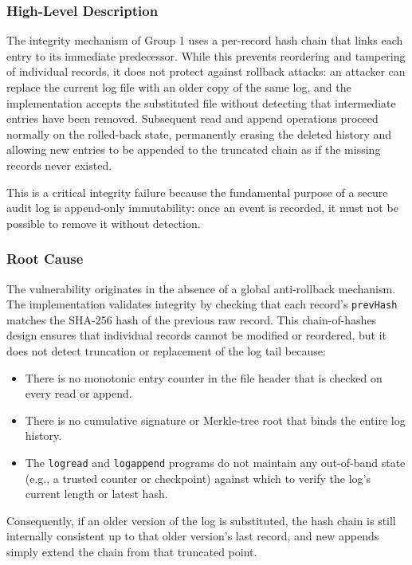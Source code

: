 \documentclass[a4paper, 12pt]{article}
\begin{document}
    \subsubsection{High-Level Description}
    The integrity mechanism of Group 1 uses a per-record hash chain that links each entry to its immediate predecessor. While this prevents reordering and tampering of individual records, it does not protect against rollback attacks: an attacker can replace the current log file with an older copy of the same log, and the implementation accepts the substituted file without detecting that intermediate entries have been removed. Subsequent read and append operations proceed normally on the rolled-back state, permanently erasing the deleted history and allowing new entries to be appended to the truncated chain as if the missing records never existed.

    This is a critical integrity failure because the fundamental purpose of a secure audit log is append-only immutability: once an event is recorded, it must not be possible to remove it without detection.

    \subsubsection{Root Cause}
    The vulnerability originates in the absence of a global anti-rollback mechanism. The implementation validates integrity by checking that each record's \texttt{prevHash} matches the SHA-256 hash of the previous raw record. This chain-of-hashes design ensures that individual records cannot be modified or reordered, but it does not detect truncation or replacement of the log tail because:
    \begin{itemize}
        \item There is no monotonic entry counter in the file header that is checked on every read or append.
        \item There is no cumulative signature or Merkle-tree root that binds the entire log history.
        \item The \texttt{logread} and \texttt{logappend} programs do not maintain any out-of-band state (e.g., a trusted counter or checkpoint) against which to verify the log's current length or latest hash.
    \end{itemize}
    Consequently, if an older version of the log is substituted, the hash chain is still internally consistent up to that older version's last record, and new appends simply extend the chain from that truncated point.
\end{document}
